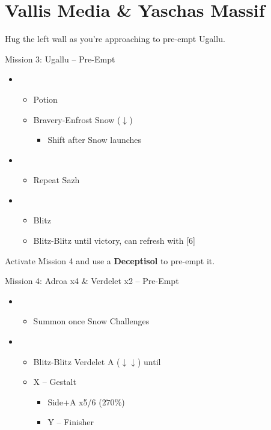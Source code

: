 \chapter{Vallis Media \& Yaschas Massif}

Hug the left wall as you're approaching to pre-empt Ugallu.

\begin{battle}{Mission 3: Ugallu -- Pre-Empt}
	\begin{itemize}
		\item \third
			\begin{itemize}
				\item Potion
				\item Bravery-Enfrost Snow ($\downarrow$)
					\begin{itemize}
						\item Shift after Snow launches
					\end{itemize}
			\end{itemize}
		\item \fourth
			\begin{itemize}
				\item Repeat Sazh
			\end{itemize}
		\item \fifth
			\begin{itemize}
				\item Blitz
				\item Blitz-Blitz until victory, can refresh with [6]
			\end{itemize}
	\end{itemize}
\end{battle}

Activate Mission 4 and use a \textbf{Deceptisol} to pre-empt it.

\begin{battle}{Mission 4: Adroa x4 \& Verdelet x2 -- Pre-Empt}
	\begin{itemize}
		\item \third
			\begin{itemize}
				\item Summon once Snow Challenges
			\end{itemize}
		\item \fifth
			\begin{itemize}
				\item Blitz-Blitz Verdelet A ($\downarrow\downarrow$) until \stagger
				\item X -- Gestalt
					\begin{itemize}
						\item Side+A x5/6 ($270\%$)
						\item Y -- Finisher
					\end{itemize}
			\end{itemize}
	\end{itemize}
\end{battle}

